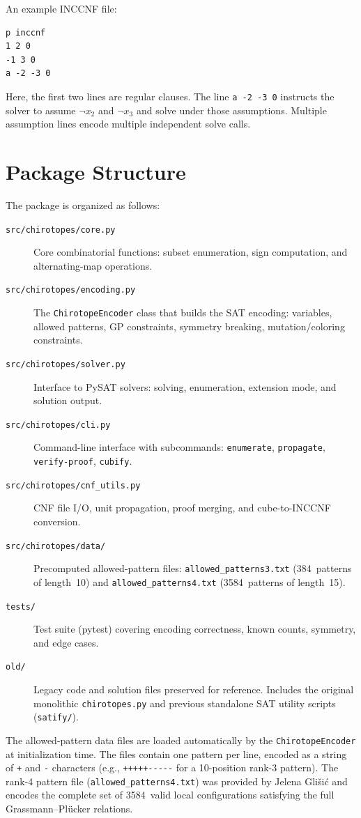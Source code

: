 \documentclass[11pt]{article}
\theoremstyle{definition}
\begin{document}
An example INCCNF file:
\begin{lstlisting}
p inccnf
1 2 0
-1 3 0
a -2 -3 0
\end{lstlisting}
Here, the first two lines are regular clauses. The line \texttt{a -2 -3 0} instructs the solver to assume $\neg x_2$ and $\neg x_3$ and solve under those assumptions. Multiple assumption lines encode multiple independent solve calls.

\section{Package Structure}
\label{sec:structure}

The package is organized as follows:

\begin{description}
\item[\texttt{src/chirotopes/core.py}] Core combinatorial functions: subset enumeration, sign computation, and alternating-map operations.
\item[\texttt{src/chirotopes/encoding.py}] The \texttt{ChirotopeEncoder} class that builds the SAT encoding: variables, allowed patterns, GP constraints, symmetry breaking, mutation/coloring constraints.
\item[\texttt{src/chirotopes/solver.py}] Interface to PySAT solvers: solving, enumeration, extension mode, and solution output.
\item[\texttt{src/chirotopes/cli.py}] Command-line interface with subcommands: \texttt{enumerate}, \texttt{propagate}, \texttt{verify-proof}, \texttt{cubify}.
\item[\texttt{src/chirotopes/cnf\_utils.py}] CNF file I/O, unit propagation, proof merging, and cube-to-INCCNF conversion.
\item[\texttt{src/chirotopes/data/}] Precomputed allowed-pattern files: \texttt{allowed\_patterns3.txt} (384~patterns of length~10) and \texttt{allowed\_patterns4.txt} (3584~patterns of length~15).
\item[\texttt{tests/}] Test suite (pytest) covering encoding correctness, known counts, symmetry, and edge cases.
\item[\texttt{old/}] Legacy code and solution files preserved for reference. Includes the original monolithic \texttt{chirotopes.py} and previous standalone SAT utility scripts (\texttt{satify/}).
\end{description}

The allowed-pattern data files are loaded automatically by the \texttt{ChirotopeEncoder} at initialization time. The files contain one pattern per line, encoded as a string of \texttt{+} and \texttt{-} characters (e.g., \texttt{+++++-{}-{}-{}-{}-} for a 10-position rank-3 pattern). The rank-4 pattern file (\texttt{allowed\_patterns4.txt}) was provided by Jelena Gli\v{s}i\'{c} and encodes the complete set of 3584~valid local configurations satisfying the full Grassmann--Pl\"ucker relations.
\end{document}
